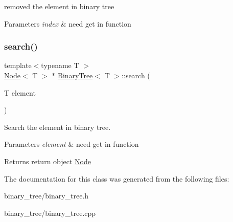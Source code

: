 removed the element in binary tree 


\begin{DoxyParams}{Parameters}
{\em index} & need get in function \\
\hline
\end{DoxyParams}
\mbox{\label{classBinaryTree_ac483087e1890a5d750522412d8d5ae52}} 
\subsubsection{\texorpdfstring{search()}{search()}}
{\footnotesize\ttfamily template$<$typename T $>$ \\
\hyperlink{structNode}{Node}$<$ T $>$ $\ast$ \hyperlink{classBinaryTree}{Binary\+Tree}$<$ T $>$\+::search (\begin{DoxyParamCaption}\item[{T}]{element }\end{DoxyParamCaption})}



Search the element in binary tree. 


\begin{DoxyParams}{Parameters}
{\em element} & need get in function \\
\hline
\end{DoxyParams}
\begin{DoxyReturn}{Returns}
return object \hyperlink{structNode}{Node} 
\end{DoxyReturn}


The documentation for this class was generated from the following files\+:\begin{DoxyCompactItemize}
\item 
binary\+\_\+tree/binary\+\_\+tree.\+h\item 
binary\+\_\+tree/binary\+\_\+tree.\+cpp\end{DoxyCompactItemize}
